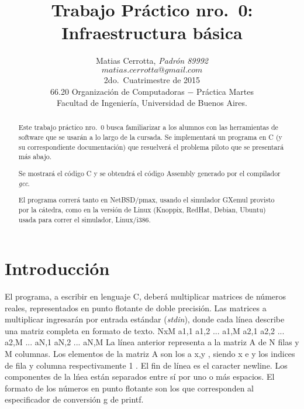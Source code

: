 \documentclass[a4paper,10pt]{article}
\begin{document}
\title{Trabajo Pr\'actico nro.~0: Infraestructura b\'asica} 

\author{	Matias Cerrotta, \textit{Padr\'on 89992} 		\\	\texttt{$matias.cerrotta@gmail.com$}	\\[2.5ex] 	
		\normalsize{2do.~Cuatrimestre de 2015}		\\
	        	\normalsize{66.20 Organizaci\'on de Computadoras  $-$ Pr\'actica Martes}	\\
          	\normalsize{Facultad de Ingenier\'ia, Universidad de Buenos Aires.}			\\
	}

\date{}
\maketitle
\thispagestyle{empty}   %
\pagebreak

\begin{abstract}
Este trabajo pr\'actico nro.~0 busca familiarizar a los alumnos con las herramientas de software que se usar\'an a lo largo de la cursada. Se implementar\'a un programa en C (y su correspondiente documentaci\'on) que resuelver\'a el problema piloto que se presentar\'a m\'as abajo. 

Se mostrar\'a el c\'odigo C y se obtendr\'a el c\'odigo Assembly generado por el compilador \textit{gcc}.

El programa correr\'a tanto en NetBSD/pmax, usando el simulador GXemul provisto por la c\'atedra, como en la versi\'on de Linux (Knoppix, RedHat, Debian, Ubuntu) usada para correr el simulador, Linux/i386.

\end{abstract} 
\pagebreak


\section{Introducci\'on}

El programa, a escribir en lenguaje C, deber\'a multiplicar matrices de n\'umeros reales, representados en punto flotante de doble precisi\'on. Las matrices a multiplicar ingresar\'an por entrada est\'andar (\textit{stdin}), donde cada l\'inea describe una matriz completa en formato de texto.
\newline \newline
NxM a1,1 a1,2 ... a1,M a2,1 a2,2 ... a2,M ... aN,1 aN,2 ... aN,M
\newline \newline
La l\'inea anterior representa a la matriz A de N filas y M columnas. Los elementos de la matriz A son los a x,y , siendo x e y los indices de fila y columna respectivamente 1 . El fin de l\'inea es el caracter newline. Los componentes de la l\'nea est\'an separados entre s\'i por uno o m\'as espacios. El formato de los n\'umeros en punto flotante son los que corresponden al especificador de conversi\'on g de printf.
\end{document}

